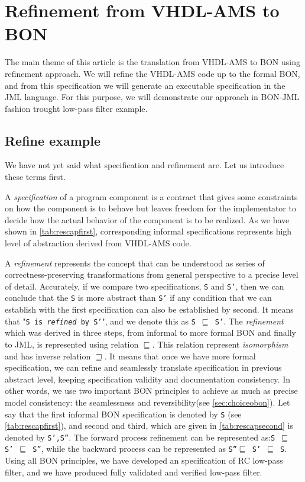 \documentclass{article}
\begin{document}
\section{Refinement from VHDL-AMS to BON }
\label{sec:refVB} The main theme of this article is the translation
from VHDL-AMS to BON using refinement approach.  We will refine the
VHDL-AMS code up to the formal BON, and from this specification we
will generate an executable specification in the JML language.  For
this purpose, we will demonstrate our approach in BON-JML fashion
trought low-pass filter example.

\subsection{Refine example }
\label{subsec:refine}     
We have not yet said what specification and refinement are.  Let us
introduce these terms first.

A \emph{specification} of a program component is a contract that gives
some constraints on how the component is to behave but leaves freedom
for the implementator to decide how the actual behavior of the
component is to be realized.  As we have shown in
\autoref{tab:rescapfirst}, corresponding informal specifications
represents high level of abstraction derived from VHDL-AMS code.

A \emph{refinement} represents the concept that can be understood as
series of correctness-preserving transformations from general
perspective to a precise level of detail. Accurately, if we compare
two specifications, \texttt{S} and \texttt{S'}, then we can conclude
that the \texttt{S} is more abstract than \texttt{S'} if any condition
that we can establish with the first specification can also be
established by second.  It means that "\texttt{S is \emph{refined} by
S'}", and we denote this as \texttt{S $\sqsubseteq$ S'}.  The
\emph{refinement} which was derived in three steps, from informal to
more formal BON and finally to JML, is represented using relation
\texttt{$\sqsubseteq$}. This relation represent \emph{isomorphism} and
has inverse relation \texttt{$\sqsupseteq$}.  It means that once we
have more formal specification, we can refine and seamlessly translate
specification in previous abstract level, keeping specification
validity and documentation consistency.  In other words, we use two
important BON principles to achieve as much as precise model
consistency: the seamlessness and reversibility(see
\autoref{sec:choiceobon}).  Let say that the first informal BON
specification is denoted by \texttt{S} (see
\autoref{tab:rescapfirst}), and second and third, which are given in
\autoref{tab:rescapsecond} is denoted by \texttt{S',S''}.  The forward
process refinement can be represented as:\xspace \texttt{S
$\sqsubseteq$ S' $\sqsubseteq$ S''}, while the backward process can be
represented as \xspace \texttt{S''$\sqsubseteq$ S' $\sqsubseteq$ S}.
Using all BON principles, we have developed an specification of RC
low-pass filter, and we have produced fully validated and verified
low-pass filter.   
\end{document}
